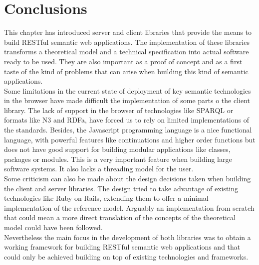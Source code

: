 \section{Conclusions}

This chapter has introduced server and client libraries that provide the means to build RESTful semantic web
applications. The implementation of these libraries transforms a theoretical model and a technical specification into
actual software ready to be used. They are also important as a proof of concept and as a first taste of the kind of
problems that can arise when building this kind of semantic applications.\\

Some limitations in the current state of deployment of key semantic technologies in the browser have made difficult the
implementation of some parts o the client library. The lack of support in the browser of technologies like SPARQL or
formats like N3 and RDFa, have forced us to rely on limited implementations of the standards. Besides, the Javascript
programming language is a nice functional language, with powerful features like continuations and higher order functions
but does not have good support for building modular applications like classes, packages or modules. This is a very
important feature when building large software systems. It also lacks a threading model for the user. \\

Some criticism can also be made about the design decisions taken when building the client and server libraries. The
design tried to take advantage of existing technologies like Ruby on Rails, extending them to offer a minimal
implementation of the reference model. Arguably an implementation from scratch that could mean a more direct translation
of the concepts of the theoretical model could have been followed.\\
Nevertheless the main focus in the development of both libraries was to obtain a working framework for building RESTful
semantic web applications and that could only be achieved building on top of existing technologies and frameworks.